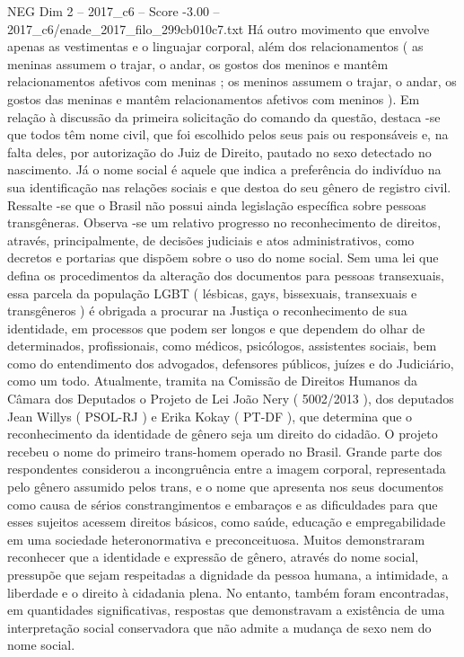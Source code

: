 \begin{textsample}{NEG Dim 2 – 2017\_c6 – Score -3.00 – 2017\_c6/enade\_2017\_filo\_299cb010c7.txt}
Há outro movimento que envolve apenas as vestimentas e o linguajar corporal, além dos relacionamentos ( as meninas assumem o trajar, o andar, os gostos dos meninos e mantêm relacionamentos afetivos com meninas ; os meninos assumem o trajar, o andar, os gostos das meninas e mantêm relacionamentos afetivos com meninos ).
Em relação à discussão da primeira solicitação do comando da questão, destaca -se que todos têm nome civil, que foi escolhido pelos seus pais ou responsáveis e, na falta deles, por autorização do Juiz de Direito, pautado no sexo detectado no nascimento.
Já o nome social é aquele que indica a preferência do indivíduo na sua identificação nas relações sociais e que destoa do seu gênero de registro civil.
Ressalte -se que o Brasil não possui ainda legislação específica sobre pessoas transgêneras.
Observa -se um relativo progresso no reconhecimento de direitos, através, principalmente, de decisões judiciais e atos administrativos, como decretos e portarias que dispõem sobre o uso do nome social.
Sem uma lei que defina os procedimentos da alteração dos documentos para pessoas transexuais, essa parcela da população LGBT ( lésbicas, gays, bissexuais, transexuais e transgêneros ) é obrigada a procurar na Justiça o reconhecimento de sua identidade, em processos que podem ser longos e que dependem do olhar de determinados, profissionais, como médicos, psicólogos, assistentes sociais, bem como do entendimento dos advogados, defensores públicos, juízes e do Judiciário, como um todo.
Atualmente, tramita na Comissão de Direitos Humanos da Câmara dos Deputados o Projeto de Lei João Nery ( 5002/2013 ), dos deputados Jean Willys ( PSOL-RJ ) e Erika Kokay ( PT-DF ), que determina que o reconhecimento da identidade de gênero seja um direito do cidadão.
O projeto recebeu o nome do primeiro trans-homem operado no Brasil.
Grande parte dos respondentes considerou a incongruência entre a imagem corporal, representada pelo gênero assumido pelos trans, e o nome que apresenta nos seus documentos como causa de sérios constrangimentos e embaraços e as dificuldades para que esses sujeitos acessem direitos básicos, como saúde, educação e empregabilidade em uma sociedade heteronormativa e preconceituosa.
Muitos demonstraram reconhecer que a identidade e expressão de gênero, através do nome social, pressupõe que sejam respeitadas a dignidade da pessoa humana, a intimidade, a liberdade e o direito à cidadania plena.
No entanto, também foram encontradas, em quantidades significativas, respostas que demonstravam a existência de uma interpretação social conservadora que não admite a mudança de sexo nem do nome social.

\end{textsample}
